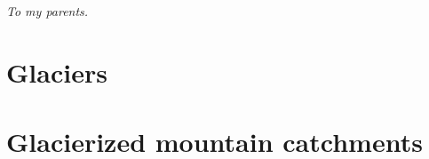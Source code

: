 \documentclass[twoside,10pt,a4paper, openright, hidelinks]{extreport}
\begin{document}
%
\newpage\null\thispagestyle{empty}\setcounter{page}{0}\newpage

\pagestyle{fancy}

\nobibliography*
{}
\dominitoc


{}
\begin{flushright}
\begin{small}
\textit{To my parents.}
\end{small}
\end{flushright}
\newpage\null\thispagestyle{empty}\newpage


\newpage
%

\tableofcontents




\newpage\null\thispagestyle{empty}\newpage

\newpage
\thispagestyle{empty}

\newpage\null\thispagestyle{empty}

\newpage \thispagestyle{empty}

\part{Glaciers}








\part{Glacierized mountain catchments}
\end{document}
